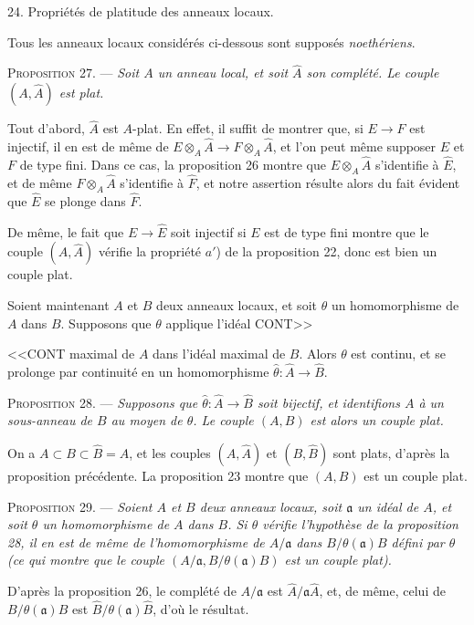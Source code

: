 24. Propriétés de platitude des anneaux locaux.

Tous les anneaux locaux considérés ci-dessous sont supposés \emph{noethériens}.

\textsc{Proposition} 27. --- \emph{Soit $A$ un anneau local, et soit $\hat{A}$ son complété. Le couple $(A, \hat{A})$ est plat.}

Tout d'abord, $\hat{A}$ est $A$-plat. En effet, il suffit de montrer que, si $E \to F$ est injectif, il en est de même de $E \otimes_A \hat{A} \to F \otimes_A \hat{A}$, et l'on peut même supposer $E$ et $F$ de type fini. Dans ce cas, la proposition 26 montre que $E \otimes_A \hat{A}$ s'identifie à $\hat{E}$, et de même $F \otimes_A \hat{A}$ s'identifie à $\hat{F}$, et notre assertion résulte alors du fait évident que $\hat{E}$ se plonge dans $\hat{F}$.

De même, le fait que $E \to \hat{E}$ soit injectif si $E$ est de type fini montre que le couple $(A, \hat{A})$ vérifie la propriété $a'$) de la proposition 22, donc est bien un couple plat.

Soient maintenant $A$ et $B$ deux anneaux locaux, et soit $\theta$ un homomorphisme de $A$ dans $B$. Supposons que $\theta$ applique l'idéal CONT>>



<<CONT maximal de $A$ dans l'idéal maximal de $B$. Alors $\theta$ est continu, et se prolonge par continuité en un homomorphisme $\hat{\theta} : \hat{A} \to \hat{B}$.

\textsc{Proposition} 28. --- \emph{Supposons que $\hat{\theta} : \hat{A} \to \hat{B}$ soit bijectif, et identifions $A$ à un sous-anneau de $B$ au moyen de $\theta$. Le couple $(A, B)$ est alors un couple plat.}

On a $A \subset B \subset \hat{B} = \hat{A}$, et les couples $(A, \hat{A})$ et $(B, \hat{B})$ sont plats, d'après la proposition précédente. La proposition 23 montre que $(A, B)$ est un couple plat.

\textsc{Proposition} 29. --- \emph{Soient $A$ et $B$ deux anneaux locaux, soit $\mathfrak{a}$ un idéal de $A$, et soit $\theta$ un homomorphisme de $A$ dans $B$. Si $\theta$ vérifie l'hypothèse de la proposition 28, il en est de même de l'homomorphisme de $A/\mathfrak{a}$ dans $B/\theta(\mathfrak{a})B$ défini par $\theta$ (ce qui montre que le couple $(A/\mathfrak{a}, B/\theta(\mathfrak{a})B)$ est un couple plat).}

D'après la proposition 26, le complété de $A/\mathfrak{a}$ est $\hat{A}/\mathfrak{a}\hat{A}$, et, de même, celui de $B/\theta(\mathfrak{a})B$ est $\hat{B}/\theta(\mathfrak{a})\hat{B}$, d'où le résultat.

